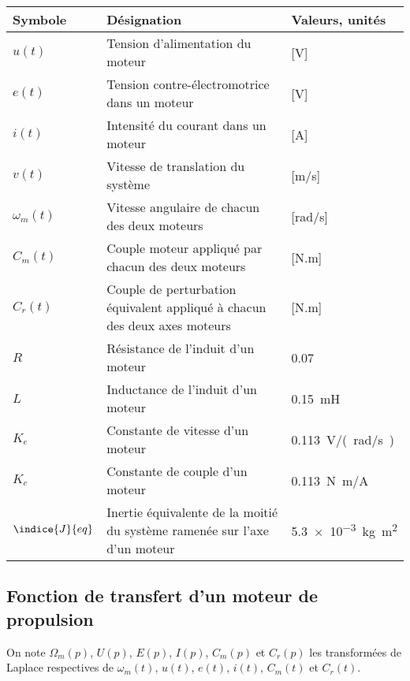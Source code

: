 \begin{table}[!h]
\centering
\begin{tabular}{lll}
\hline
\textbf{Symbole} & \textbf{Désignation} & \textbf{Valeurs, unités} \\
\hline
$u(t)$ 		& Tension d’alimentation du moteur 		& [V] \\
$e(t)$ 		& Tension contre-électromotrice dans un moteur 	&[V] \\
$i(t)$	 	& Intensité du courant dans un moteur 		& [A] \\
$v(t)$ 		& Vitesse de translation du système 		& [m/s] \\
$\omega_m(t)$	& Vitesse angulaire de chacun des deux moteurs	& [rad/s]\\
$C_m(t)$ 	& Couple moteur appliqué par chacun des deux moteurs & [N.m]\\
$C_r(t)$	& Couple de perturbation équivalent appliqué à chacun des deux axes moteurs & [N.m] \\
$R$ 		& Résistance de l’induit d’un moteur 		& \SI{0,07}{\Omega} \\
$L$ 		& Inductance de l’induit d’un moteur 		& \SI{0,15}{mH} \\
$K_e$ 		& Constante de vitesse d’un moteur 		& \SI{0,113}{V/(rad/s)}\\
$K_c$ 		& Constante de couple d’un moteur 		& \SI{0,113}{N.m/A}\\
$\indice{J}{eq}$& Inertie équivalente de la moitié du système ramenée sur l’axe d’un moteur 
								& \SI{5,3e-3}{kg.m^2}\\\hline
\end{tabular}
\end{table}

\subsection*{Fonction de transfert d’un moteur de propulsion}

On note $\Omega_m(p)$, $U(p)$, $E(p)$, $I(p)$, $C_m(p)$ et $C_r(p)$ les transformées de Laplace respectives de $\omega_m(t)$,
$u(t)$, $e(t)$, $i(t)$, $C_m(t)$ et $C_r(t)$.



